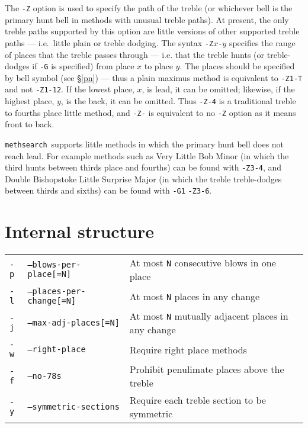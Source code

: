 \documentclass[a4paper,11pt,oneside]{book}
\makeatletter
\newcommand{\oidx}[2]{\index{#1@{\hspace*{-\optwidth}\texttt{-}#2}|ulink}}
\newcommand{\oid}[2]{\oidx{#1}{\texttt{#1}}%
  \index{#2@{\hspace*{-\loptwidth}\texttt{--#2}}|see{\texttt{-#1}}}}
\def\methsearch{\texttt{meth\-search}}
\newcommand{\sref}[1]{\hyperref[#1]{\S\ref{#1}}}
\makeatother
\begin{document}
The \verb+-Z+ option is used to specify the path of the treble (or
whichever bell is the primary hunt bell in methods with unusual treble paths).%
\oid{Z}{treble-path}
At present, the only treble paths supported by this option are little versions
of other supported treble paths --- i.e.\ little plain or treble dodging.
The syntax \verb+-Z+$x$\verb+-+$y$ specifies the 
range of places that the treble passes through --- i.e. that the treble hunts
(or treble-dodges if \verb+-G+ is specified) from place $x$ to place $y$.
The places should be specified by bell symbol (see \sref{pn}) --- thus a plain
maximus method is equivalent to \verb+-Z1-T+ and not \verb+-Z1-12+.  
If the lowest place, $x$, is lead, it can be omitted; 
likewise, if the highest place, $y$, is the back, it can be omitted.  
Thus \verb+-Z-4+ is a traditional treble to
fourths place little method, and \verb+-Z-+ is equivalent to no \verb+-Z+ 
option as it means front to back.

\methsearch\ supports little methods in which the primary hunt bell does not
reach lead.  For example methods such as 
Very Little Bob Minor 
(in which the third hunts between thirds place and fourths) 
can be found with \verb+-Z3-4+, and Double Bishopstoke Little Surprise Major%
(in which the treble treble-dodges between thirds and sixths) 
can be found with \verb+-G1+ \verb+-Z3-6+.


\section{Internal structure}\label{int_struct}

\begin{tabularx}{\textwidth}{llX}
\texttt{-p}&\texttt{--blows-per-place[=N]}&
  At most \texttt{N} consecutive blows in one place\\
\texttt{-l}&\texttt{--places-per-change[=N]}&
  At most \texttt{N} places in any change\\
\texttt{-j}&\texttt{--max-adj-places[=N]}&
  At most \texttt{N} mutually adjacent places in any change\\
\texttt{-w}&\texttt{--right-place}&
  Require right place methods\\
\texttt{-f}&\texttt{--no-78s}&
  Prohibit penulimate places above the treble\\
\texttt{-y}&\texttt{--symmetric-sections}&
  Require each treble section to be symmetric\\
\end{tabularx}
\end{document}
